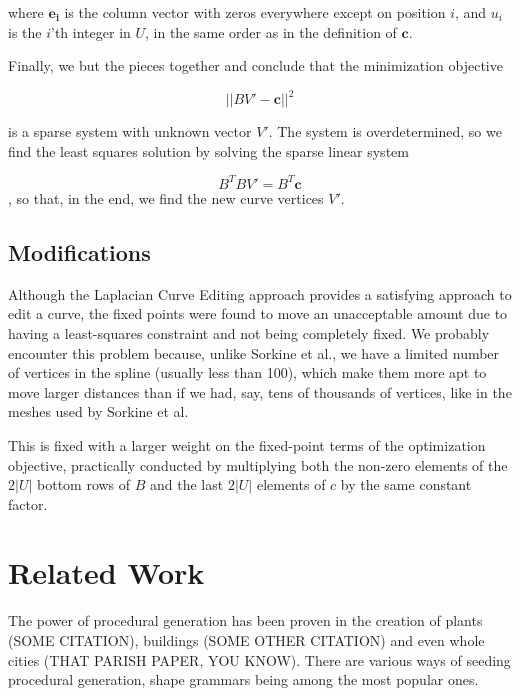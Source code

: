 \documentclass[english]{article}
\begin{document}
where $\mathbf{e_i}$ is the column vector with zeros everywhere except on position $i$, and $u_i$ is the $i$'th integer in $U$, in the same order as in the definition of $\mathbf{c}$.

Finally, we but the pieces together and conclude that the minimization objective

\[
||BV'- \mathbf{c}||^2
\]

is a sparse system with unknown vector $V'$. The system is overdetermined, so we find the least squares solution by solving the sparse linear system

\[
B^TBV' = B^T\mathbf{c}
\],
so that, in the end, we find the new curve vertices $V'$.

\subsection*{Modifications}

Although the Laplacian Curve Editing approach provides a satisfying approach to edit a curve, the fixed points were found to move an unacceptable amount due to having a least-squares constraint and not being completely fixed. We probably encounter this problem because, unlike Sorkine et al., we have a limited number of vertices in the spline (usually less than 100), which make them more apt to move larger distances than if we had, say, tens of thousands of vertices, like in the meshes used by Sorkine et al.

This is fixed with a larger weight on the fixed-point terms of the optimization objective, practically conducted by multiplying both the non-zero elements of the $2|U|$ bottom rows of $B$ and the last $2|U|$ elements of $c$ by the same constant factor.

\section{Related Work}

The power of procedural generation has been proven in the creation of plants (SOME CITATION), buildings (SOME OTHER CITATION) and even whole cities (THAT PARISH PAPER, YOU KNOW). There are various ways of seeding procedural generation, shape grammars being among the most popular ones.
\end{document}
